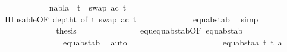 \begin{isabellebody}
\ \ \ \ \ \ \ \ \ \ \ \isamarkupfalse%
\ {\isachardoublequoteopen}nabla\ {\isasymturnstile}\ t{}{\isacharprime}{\kern0pt}\ {\isasymapprox}\ swap\ {\isacharbrackleft}{\kern0pt}{\isacharparenleft}{\kern0pt}a{\isacharcomma}{\kern0pt}c{\isacharparenright}{\kern0pt}{\isacharbrackright}{\kern0pt}\ t{}{\isacharprime}{\kern0pt}{\isachardoublequoteclose}\isanewline
\ \ \ \ \ \ \ \ \ \ \ \ \ \isamarkupfalse%
\ {}{\isacharparenleft}{\kern0pt}{}{\isacharcomma}{\kern0pt}{}{\isacharcomma}{\kern0pt}{}{\isacharcomma}{\kern0pt}{}{\isacharparenright}{\kern0pt}\ IH{\isacharunderscore}{\kern0pt}usable{\isacharbrackleft}{\kern0pt}OF\ deptht{}{\isacharcomma}{\kern0pt}\ of\ {\isacartoucheopen}t{}{\isacharprime}{\kern0pt}{\isacartoucheclose}\ {\isacartoucheopen}swap\ {\isacharbrackleft}{\kern0pt}{\isacharparenleft}{\kern0pt}a{\isacharcomma}{\kern0pt}c{\isacharparenright}{\kern0pt}{\isacharbrackright}{\kern0pt}\ t{}{\isacharprime}{\kern0pt}{\isacartoucheclose}{\isacharbrackright}{\kern0pt}\ \isanewline
\ \ \ \ \ \ \ \ \ \ \ \ equ{\isacharunderscore}{\kern0pt}abst{\isacharunderscore}{\kern0pt}ab{\isacharparenleft}{\kern0pt}{}{\isacharcomma}{\kern0pt}{}{\isacharcomma}{\kern0pt}{}{\isacharparenright}{\kern0pt}\ \isamarkupfalse%
\ simp\isanewline
\ \ \ \ \ \ \ \ \ \ \ \isamarkupfalse%
\ \isamarkupfalse%
\ {\isacharquery}{\kern0pt}thesis\isanewline
\ \ \ \ \ \ \ \ \ \ \ \ \ \isamarkupfalse%
\ equ{\isachardot}{\kern0pt}equ{\isacharunderscore}{\kern0pt}abst{\isacharunderscore}{\kern0pt}ab{\isacharbrackleft}{\kern0pt}OF\ equ{\isacharunderscore}{\kern0pt}abst{\isacharunderscore}{\kern0pt}ab{\isacharparenleft}{\kern0pt}{}{\isacharparenright}{\kern0pt}{\isacharbrackright}{\kern0pt}\isanewline
\ \ \ \ \ \ \ \ \ \ \ \ \ \ \ {}{\isacharparenleft}{\kern0pt}{}{\isacharcomma}{\kern0pt}{}{\isacharcomma}{\kern0pt}{}{\isacharparenright}{\kern0pt}\ equ{\isacharunderscore}{\kern0pt}abst{\isacharunderscore}{\kern0pt}ab{\isacharparenleft}{\kern0pt}{}{\isacharcomma}{\kern0pt}{}{\isacharcomma}{\kern0pt}{}{\isacharparenright}{\kern0pt}\ \isamarkupfalse%
\ auto\isanewline
\ \ \ \ \ \ \ \ \ \isamarkupfalse%
\isanewline
\ \ \ \ \ \ \ \ \ \ \ \isamarkupfalse%
\ {\isacharparenleft}{\kern0pt}equ{\isacharunderscore}{\kern0pt}abst{\isacharunderscore}{\kern0pt}aa\ t{}{\isacharprime}{\kern0pt}\ t{}{\isacharprime}{\kern0pt}\ a{\isacharparenright}{\kern0pt}\isanewline

\end{isabellebody}
